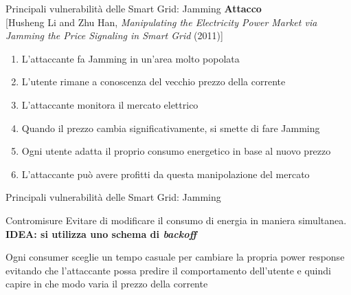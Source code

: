 \begin{frame}{Principali vulnerabilità delle Smart Grid: Jamming}
	\textbf{Attacco}\\
	{\small [Husheng Li and Zhu Han, \emph{Manipulating the Electricity Power Market via Jamming the Price Signaling in Smart Grid} (2011)]}
	\begin{enumerate}[<+- | alert@+>]
		\item L'attaccante fa Jamming in un'area molto popolata
		\item L'utente rimane a conoscenza del vecchio prezzo della corrente
		\item L'attaccante monitora il mercato elettrico
		\item Quando il prezzo cambia significativamente, si smette di fare Jamming
		\item Ogni utente adatta il proprio consumo energetico in base al nuovo prezzo
		\item L'attaccante può avere profitti da questa manipolazione del mercato
	\end{enumerate}
\end{frame}

\begin{frame}{Principali vulnerabilità delle Smart Grid: Jamming}
	\begin{block}{Contromisure}
		Evitare di modificare il consumo di energia in maniera simultanea.\newline
		\textbf{\color{blue_slides}IDEA: si utilizza uno schema di \emph{backoff}} 
	\end{block}
	\pause
	\begin{block}{}
	Ogni consumer sceglie un tempo casuale per cambiare la propria power response evitando che l'attaccante possa predire il comportamento dell'utente e quindi capire in che modo varia il prezzo della corrente
	\end{block}
\end{frame}
